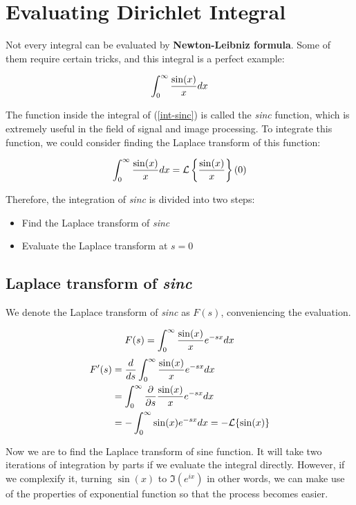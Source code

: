 \section{Evaluating Dirichlet Integral}

Not every integral can be evaluated by \textbf{Newton-Leibniz formula}. Some of
them require certain tricks, and this integral is a perfect example:

\begin{equation}
	\int_0^\infty{\sin(x)\over x}dx
	\label{int-sinc}
\end{equation}

The function inside the integral of (\ref{int-sinc}) is called the
\textit{sinc} function, which is extremely useful in the field of signal and
image processing. To integrate this function, we could consider finding the
Laplace transform of this function:

\begin{equation}
	\int_0^\infty{\sin(x)\over x}dx=\mathcal{L}
	\left\{\sin(x)\over x\right\}(0)
	\label{sinc-laplace}
\end{equation}

Therefore, the integration of \textit{sinc} is divided into two steps:

\begin{itemize}
	\item Find the Laplace transform of \textit{sinc}
	\item Evaluate the Laplace transform at $s=0$
\end{itemize}

\subsection{Laplace transform of \textit{sinc}}

We denote the Laplace transform of \textit{sinc} as $F(s)$, conveniencing the
evaluation.

$$F(s)=\int_0^\infty{\sin(x)\over x}e^{-sx}dx$$
$$
\begin{aligned}
	F'(s)&={d\over ds}\int_0^\infty{\sin(x)\over x}e^{-sx}dx \\
	&=\int_0^\infty{\partial\over\partial s}{\sin(x)\over x}e^{-sx}dx \\
	&=-\int_0^\infty\sin(x)e^{-sx}dx=-\mathcal{L}\{\sin(x)\}
\end{aligned}
$$

Now we are to find the Laplace transform of sine function. It will take two
iterations of integration by parts if we evaluate the integral directly.
However, if we complexify it, turning $\sin(x)$ to $\Im\left(e^{ix}\right)$ in
other words, we can make use of the properties of exponential function so that
the process becomes easier.

